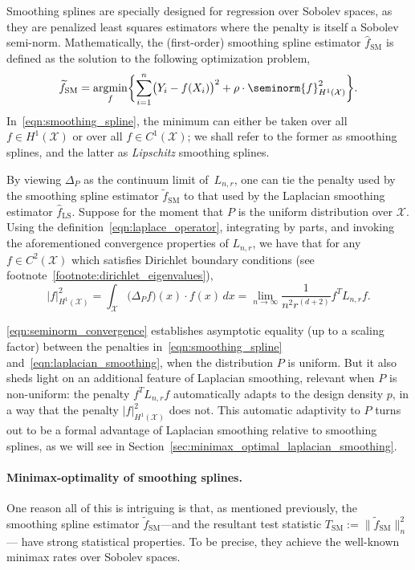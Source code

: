 \documentclass[twoside]{article}
\newcommand{\abs}[1]{\left \lvert #1 \right \rvert}
\newcommand{\1}{\mathbf{1}}
\DeclareMathOperator*{\argmin}{argmin}
\newcommand{\Lap}{L}
\newcommand{\Xset}{\mathcal{X}}
\newcommand{\wt}[1]{\widetilde{#1}}
\newcommand{\wh}[1]{\widehat{#1}}
\newcommand{\LS}{\mathrm{LS}}
\newcommand{\SM}{\mathrm{SM}}
\theoremstyle{definition}
\theoremstyle{remark}
\begin{document}
Smoothing splines are specially designed for regression over Sobolev spaces, as they are penalized least squares estimators where the penalty is itself a Sobolev semi-norm. Mathematically, the (first-order) smoothing spline estimator $\wh{f}_{\SM}$ is defined as the solution to the following optimization problem,
\begin{equation}
\label{eqn:smoothing_spline}
\wt{f}_{\SM} = \argmin_{f} \biggl\{\sum_{i = 1}^{n} \bigl(Y_i - f(X_i)\bigr)^2 + \rho \cdot \seminorm{f}_{H^{1}(\Xset)}^2\biggr\}.
\end{equation}
In~\eqref{eqn:smoothing_spline}, the minimum can either be taken over all $f \in H^1(\Xset)$ or over all $f \in C^1(\Xset)$; we shall refer to the former as smoothing splines, and the latter as \emph{Lipschitz} smoothing splines.

By viewing $\Delta_P$ as the continuum limit of~$\Lap_{n,r}$, one can tie the penalty used by the smoothing spline estimator $\wt{f}_{\SM}$ to that used by the Laplacian smoothing estimator $\wh{f}_{\LS}$. Suppose for the moment that $P$ is the uniform distribution over $\Xset$. Using the definition~\eqref{eqn:laplace_operator}, integrating by parts, and invoking the aforementioned convergence properties of $\Lap_{n,r}$, we have that for any $f \in C^{2}(\Xset)$ which satisfies Dirichlet boundary conditions (see footnote~\ref{footnote:dirichlet_eigenvalues}),
\begin{equation}
\label{eqn:seminorm_convergence}
\abs{f}_{H^1(\Xset)}^2 = \int_{\Xset} \bigl(\Delta_P f\bigr)(x) \cdot f(x) \,dx = \lim_{n \to \infty} \frac{1}{n^{2}r^{(d + 2)}}f^T \Lap_{n,r} f.
\end{equation}

\eqref{eqn:seminorm_convergence} establishes asymptotic equality (up to a scaling factor) between the penalties in~\eqref{eqn:smoothing_spline} and~\eqref{eqn:laplacian_smoothing}, when the distribution $P$ is uniform. But it also sheds light on an additional feature of Laplacian smoothing, relevant when $P$ is non-uniform: the penalty $f^T \Lap_{n,r} f$ automatically adapts to the design density $p$, in a way that the penalty $|f|_{H^1(\Xset)}^2$ does not. This automatic adaptivity to $P$ turns out to be a formal advantage of Laplacian smoothing relative to smoothing splines, as we will see in Section~\ref{sec:minimax_optimal_laplacian_smoothing}.

\paragraph{Minimax-optimality of smoothing splines.} 
One reason all of this is intriguing is that, as mentioned previously, the smoothing spline estimator $\wt{f}_{\SM}$---and the resultant test statistic $T_{\SM} := \|\wt{f}_{\SM}\|_n^2$--- have strong statistical properties. To be precise, they achieve the well-known minimax rates over Sobolev spaces.
\end{document}
